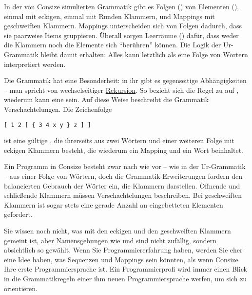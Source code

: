 In der von Consize simulierten Grammatik gibt es Folgen () von Elementen (), einmal mit eckigen, einmal mit Runden Klammern, und Mappings mit geschweiften Klammern. Mappings unterscheiden sich von Folgen dadurch, dass sie paarweise Items gruppieren.
Überall sorgen Leerräume () dafür, dass weder die Klammern noch die Elemente sich "`berühren"' können. Die Logik der Ur-Grammatik bleibt damit erhalten: Alles kann letztlich als eine Folge von Wörtern interpretiert werden.

Die Grammatik hat eine Besonderheit: in ihr gibt es gegenseitige Ab\-hän\-gig\-kei\-ten -- man spricht von wechselseitiger \href{http://de.wikipedia.org/wiki/Rekursion}{Rekursion}. So bezieht sich die Regel zu  auf ,  wiederum kann eine  sein. Auf diese Weise beschreibt die Grammatik Verschachtelungen. Die Zeichenfolge

\begin{verbatim}
[ 1 2 [ { 3 4 x y } z ] ]
\end{verbatim}

ist eine gültige , die ihrerseits aus zwei Wörtern und einer weiteren Folge mit eckigen Klammern besteht, die wiederum ein Mapping und ein Wort beinhaltet.

Ein Programm in Consize besteht zwar nach wie vor -- wie in der Ur-Grammatik -- aus einer Folge von Wörtern, doch die Grammatik-Er\-wei\-ter\-ungen fordern den balancierten Gebrauch der Wörter ein, die Klammern darstellen. Öffnende und schließende Klammern müssen Verschachtelungen beschreiben. Bei geschweiften Klammern ist sogar stets eine gerade Anzahl an eingebetteten Elementen gefordert.

%

Sie wissen noch nicht, was mit den eckigen und den geschweiften Klammern gemeint ist, aber Namensgebungen wie  und  sind nicht zufällig, sondern absichtlich so gewählt. Wenn Sie Programmiererfahrung haben, werden Sie eher eine Idee haben, was Sequenzen und Mappings sein könnten, als wenn Consize Ihre erste Programmiersprache ist. Ein Programmierprofi wird immer einen Blick in die Grammatikregeln einer ihm neuen Programmiersprache werfen, um sich zu orientieren.

